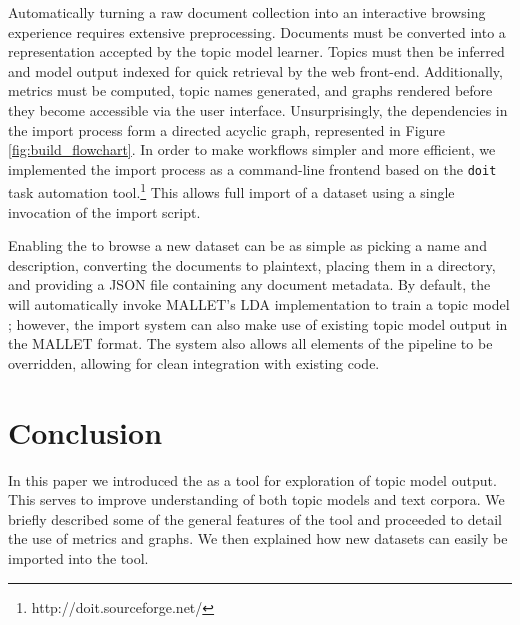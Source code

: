 \documentclass[11pt]{article}
\begin{document}
Automatically turning a raw document collection into an interactive browsing
experience requires extensive preprocessing. Documents must be converted into a
representation accepted by the topic model learner. Topics must then be inferred
and model output indexed for quick retrieval by the web front-end.
Additionally, metrics must be computed, topic names generated, and graphs rendered
before they become accessible via the user interface. Unsurprisingly, the dependencies
in the import process form a directed acyclic graph, represented in Figure \ref{fig:build_flowchart}.
In order to make workflows simpler and more efficient, we implemented
the import process as a command-line frontend based on the \texttt{doit}
task automation tool.\footnote{http://doit.sourceforge.net/} This allows full
import of a dataset using a single invocation of the import script.

Enabling the \tool{} to browse a new dataset can be as simple as picking a name
and description, converting the documents to plaintext, placing them in a
directory, and providing a JSON file containing any document metadata. By default,
the \tool{} will automatically invoke MALLET's LDA implementation to train a
topic model \cite{McCallum2002}; however, the import system can also make use of
existing topic model output in the MALLET format. The system also allows all
elements of the pipeline to be overridden, allowing for clean integration with
existing code.

\section{Conclusion}
In this paper we introduced the \tool{} as a tool for exploration of
topic model output. This serves to improve understanding of both topic models
and text corpora. We briefly described some of the general features of the tool
and proceeded to detail the use of metrics and graphs. We then explained how
new datasets can easily be imported into the tool.



\end{document}
